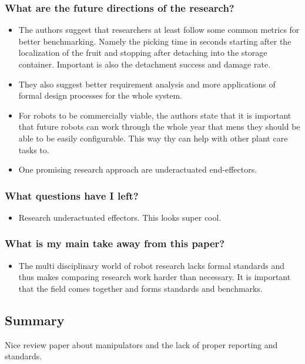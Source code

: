     \subsubsection*{What are the future directions of the research?}
    \begin{itemize}
        \item The authors suggest that researchers at least follow some common metrics for better benchmarking. Namely the picking time in seconds starting after the localization of the fruit and stopping after detaching into the storage container. Important is also the detachment success and damage rate.
        \item They also suggest better requirement analysis and more applications of formal design processes for the whole system.
        \item For robots to be commercially viable, the authors state that it is important that future robots can work through the whole year that mens they should be able to be easily configurable. This way thy can help with other plant care tasks to.  
        \item One promising research approach are underactuated end-effectors. 
    \end{itemize}
    \subsubsection*{What questions have I left?}
    \begin{itemize}
        \item Research underactuated effectors. This looks super cool.
    \end{itemize}
    \subsubsection*{What is my main take away from this paper?}
    \begin{itemize}
        \item The multi disciplinary world of robot research lacks formal standards and thus makes comparing research work harder than necessary. It is important that the field comes together and forms standards and benchmarks.
    \end{itemize}
    
    \subsection*{Summary}
    Nice review paper about manipulators and the lack of proper reporting and standards.
    

